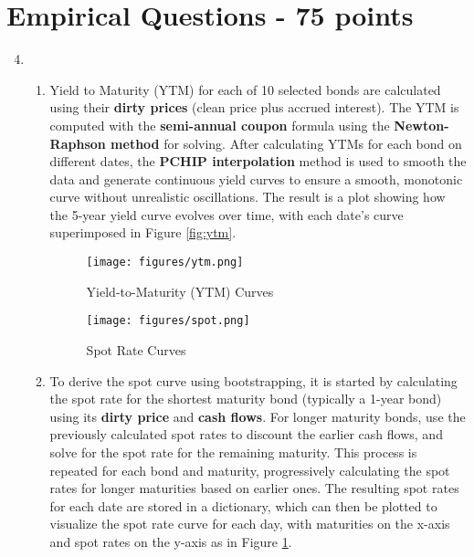 \documentclass{article}
\begin{document}
\section*{Empirical Questions - 75 points} 

\begin{enumerate}
\setcounter{enumi}{3} 
    \item
    \begin{enumerate}
        \item Yield to Maturity (YTM) for each of 10 selected bonds  are calculated using their \textbf{dirty prices} (clean price plus accrued interest). The YTM is computed with the \textbf{semi-annual coupon} formula using the \textbf{Newton-Raphson method} for solving. After calculating YTMs for each bond on different dates, the \textbf{PCHIP interpolation} method is used to smooth the data and generate continuous yield curves to ensure a smooth, monotonic curve without unrealistic oscillations. The result is a plot showing how the 5-year yield curve evolves over time, with each date's curve superimposed in Figure \ref{fig:ytm}.
        
        \begin{figure}[htbp]
            \centering
            \begin{minipage}{0.499\linewidth}
                \centering
                \texttt{[image: figures/ytm.png]}
                \caption{Yield-to-Maturity (YTM) Curves}
                \label{fig:ytm}
            \end{minipage}
            \hfill
            \begin{minipage}{0.49\linewidth}
                \centering
                \texttt{[image: figures/spot.png]}
                \caption{Spot Rate Curves}
                \label{fig:spot}
            \end{minipage}
        \end{figure}
                
        \item To derive the spot curve using bootstrapping, it is started by calculating the spot rate for the shortest maturity bond (typically a 1-year bond) using its \textbf{dirty price} and \textbf{cash flows}. For longer maturity bonds, use the previously calculated spot rates to discount the earlier cash flows, and solve for the spot rate for the remaining maturity. This process is repeated for each bond and maturity, progressively calculating the spot rates for longer maturities based on earlier ones. The resulting spot rates for each date are stored in a dictionary, which can then be plotted to visualize the spot rate curve for each day, with maturities on the x-axis and spot rates on the y-axis as in Figure \ref{fig:spot}.
        

\end{enumerate}
\end{enumerate}
\end{document}
